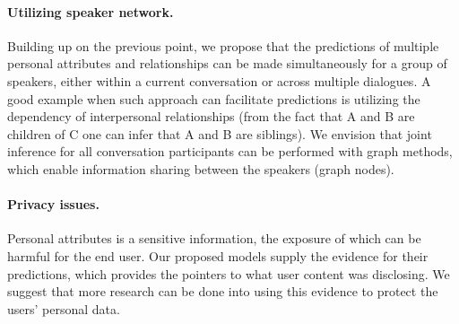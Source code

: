 \documentclass[11pt, oneside]{book}
\begin{document}
\paragraph{Utilizing speaker network.} Building up on the previous point, we propose that the predictions of multiple personal attributes and relationships can be made simultaneously for a group of speakers, either within a current conversation or across multiple dialogues. A good example when such approach can facilitate predictions is utilizing the dependency of interpersonal relationships (from the fact that A and B are children of C one can infer that A and B are siblings). We envision that joint inference for all conversation participants can be performed with graph methods, which enable information sharing between the speakers (graph nodes).

\paragraph{Privacy issues.} Personal attributes is a sensitive information, the exposure of which can be harmful for the end user. Our proposed models supply the evidence for their predictions, which provides the pointers to what user content was disclosing. We suggest that more research can be done into using this evidence to protect the users' personal data. 
\end{document}

